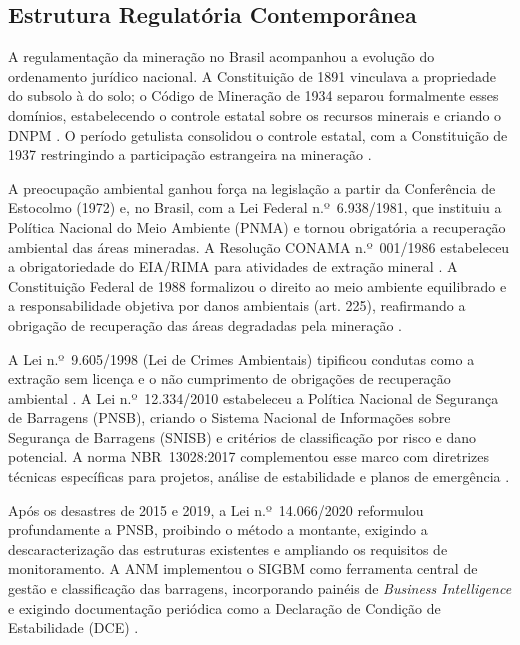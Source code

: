 \subsection{Estrutura Regulatória Contemporânea}
\label{sec:legislacao}

A regulamentação da mineração no Brasil acompanhou a evolução do ordenamento jurídico nacional. A Constituição de 1891 vinculava a propriedade do subsolo à do solo; o Código de Mineração de 1934 separou formalmente esses domínios, estabelecendo o controle estatal sobre os recursos minerais e criando o DNPM \cite{mme2025linha}. O período getulista consolidou o controle estatal, com a Constituição de 1937 restringindo a participação estrangeira na mineração \cite{mme2025linha}.

A preocupação ambiental ganhou força na legislação a partir da Conferência de Estocolmo (1972) e, no Brasil, com a Lei Federal n.º~6.938/1981, que instituiu a Política Nacional do Meio Ambiente (PNMA) e tornou obrigatória a recuperação ambiental das áreas mineradas. A Resolução CONAMA n.º~001/1986 estabeleceu a obrigatoriedade do EIA/RIMA para atividades de extração mineral \cite{barros2017legislacao, conama1986resolucao001}. A Constituição Federal de 1988 formalizou o direito ao meio ambiente equilibrado e a responsabilidade objetiva por danos ambientais (art. 225), reafirmando a obrigação de recuperação das áreas degradadas pela mineração \cite{brasil1988constituicao}.

A Lei n.º~9.605/1998 (Lei de Crimes Ambientais) tipificou condutas como a extração sem licença e o não cumprimento de obrigações de recuperação ambiental \cite{brasil1998lei9605}. A Lei n.º~12.334/2010 estabeleceu a Política Nacional de Segurança de Barragens (PNSB), criando o Sistema Nacional de Informações sobre Segurança de Barragens (SNISB) e critérios de classificação por risco e dano potencial. A norma NBR~13028:2017 complementou esse marco com diretrizes técnicas específicas para projetos, análise de estabilidade e planos de emergência \cite{brasil2010pnsb, abnt2017}.

Após os desastres de 2015 e 2019, a Lei n.º~14.066/2020 reformulou profundamente a PNSB, proibindo o método a montante, exigindo a descaracterização das estruturas existentes e ampliando os requisitos de monitoramento. A ANM implementou o SIGBM como ferramenta central de gestão e classificação das barragens, incorporando painéis de \textit{Business Intelligence} e exigindo documentação periódica como a Declaração de Condição de Estabilidade (DCE) \cite{brasil2020lei14066, anmsistema2020}.

